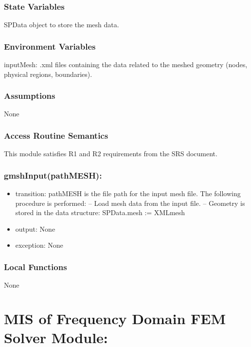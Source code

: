 \documentclass[12pt, titlepage]{article}
\begin{document}
	\subsubsection{State Variables}
	
	SPData object to store the mesh data.
	
	\subsubsection{Environment Variables} inputMesh: .xml files containing the data
	related to the meshed geometry (nodes, physical regions, boundaries).
	
	\subsubsection{Assumptions}
	
	None
	
	\subsubsection{Access Routine Semantics}
	
	This module satisfies R1 and R2 requirements from the SRS document.
	
	\subsubsection*{gmshInput(pathMESH):} \begin{itemize} \item transition: pathMESH
		is the file path for the input mesh file. The following procedure is performed:
		\subitem -- Load mesh
		data from the input file. \subitem  -- Geometry
		is stored in the data structure: SPData.mesh := XMLmesh
		
		\item output: None 
		\item exception: None \\		
		
	\end{itemize}
	
	\subsubsection{Local Functions}
	
	None \newpage %
	\section{MIS of Frequency Domain FEM Solver Module:} \label{FDSM}
	
\end{document}
